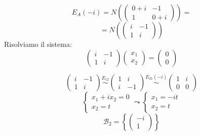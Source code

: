 \documentclass[a4paper]{article}
\theoremstyle{break}
\theoremstyle{break}
\theoremstyle{break}
\theoremstyle{break}
\begin{document}
\begin{example}
\begin{itemize}
      \vspace{2em}
      \[
      E_A(-i) = N \left( 
        \begin{pmatrix} 
          0 + i & -1\\
          1 & 0 + i
        \end{pmatrix}
      \right)
      =
      \] 
      \[
      = N \left( 
        \begin{pmatrix} 
          i & -1\\
          1 & i
        \end{pmatrix}
      \right)
      \] 
      Risolviamo il sistema:
      \[
      \begin{pmatrix} 
        i & -1\\
        1 & i
      \end{pmatrix}
      \begin{pmatrix} 
        x_1\\
        x_2
      \end{pmatrix}
      =
      \begin{pmatrix} 
        0\\
        0
      \end{pmatrix}
      \] 
      
      \[
      \begin{pmatrix} 
        i & -1\\
        1 & i
      \end{pmatrix}
      \stackrel{E_{12}}{\sim}
      \begin{pmatrix} 
        1 & i\\
        i & -1
      \end{pmatrix}
      \stackrel{E_{21}(-i)}{\sim}
      \begin{pmatrix} 
        1 & i\\
        0 & 0
      \end{pmatrix}
      \] 
      \[
      \begin{cases}
        x_1 + ix_2 = 0\\
        x_2 = t
      \end{cases}
      \leadsto
      \begin{cases}
        x_1 = -it\\
        x_2 = t
      \end{cases}
      \] 
      \[
      \mathcal{B}_2 = \left\{ \begin{pmatrix} -i\\1 \end{pmatrix}  \right\}
      \] 


\end{itemize}
\end{example}
\end{document}
